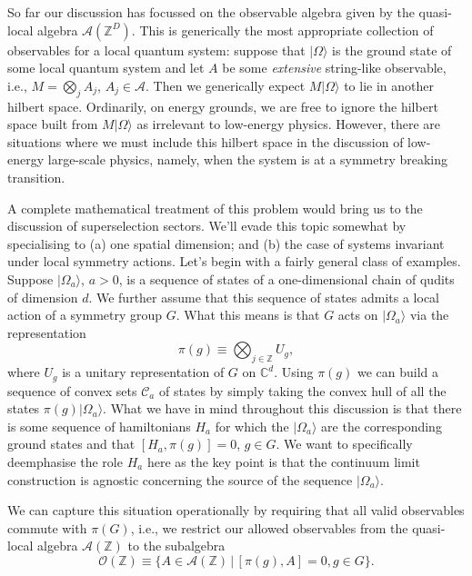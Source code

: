 \documentclass[prl,twocolumn,lengthcheck,superscriptaddress]{revtex4-1}
\theoremstyle{definition}
\theoremstyle{remark}
\begin{document}
So far our discussion has focussed on the observable algebra given by the quasi-local algebra $\mathcal{A}(\mathbb{Z}^D)$. This is generically the most appropriate collection of observables for a local quantum system: suppose that $|\Omega\rangle$ is the ground state of some local quantum system and let $A$ be some \emph{extensive} string-like observable, i.e., $M = \bigotimes_{j} A_j$, $A_j\in \mathcal{A}$. Then we generically expect $M|\Omega\rangle$ to lie in another hilbert space. Ordinarily, on energy grounds, we are free to ignore the hilbert space built from $M|\Omega\rangle$ as irrelevant to low-energy physics. However, there are situations where we must include this hilbert space in the discussion of low-energy large-scale physics, namely, when the system is at a symmetry breaking transition. 

A complete mathematical treatment of this problem would bring us to the discussion of superselection sectors. We'll evade this topic somewhat by specialising to (a) one spatial dimension; and (b) the case of systems invariant under local symmetry actions. Let's begin with a fairly general class of examples. Suppose $|\Omega_a\rangle$, $a>0$, is a sequence of states of a one-dimensional chain of qudits of dimension $d$. We further assume that this sequence of states admits a local action of a symmetry group $G$. What this means is that $G$ acts on $|\Omega_a\rangle$ via the representation
\begin{equation}
	\pi(g) \equiv \bigotimes_{j\in\mathbb{Z}} U_g,
\end{equation}
where $U_g$ is a unitary representation of $G$ on $\mathbb{C}^d$. Using $\pi(g)$ we can build a sequence of convex sets $\mathcal{C}_a$ of states by simply taking the convex hull of all the states $\pi(g)|\Omega_a\rangle$. What we have in mind throughout this discussion is that there is some sequence of hamiltonians $H_a$ for which the $|\Omega_a\rangle$ are the corresponding ground states and that $[H_a, \pi(g)] = 0$, $g\in G$. We want to specifically deemphasise the role $H_a$ here as the key point is that the continuum limit construction is agnostic concerning the source of the sequence $|\Omega_a\rangle$. 

We can capture this situation operationally by requiring that all valid observables commute with $\pi(G)$, i.e., we restrict our allowed observables from the quasi-local algebra $\mathcal{A}(\mathbb{Z})$ to the subalgebra 
\begin{equation}
	\mathcal{O}(\mathbb{Z}) \equiv \{A\in \mathcal{A}(\mathbb{Z})\,|\, [\pi(g),A] = 0, g \in G\}.
\end{equation}
\end{document}
